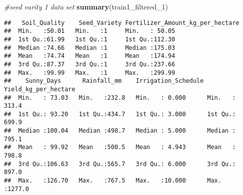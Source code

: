 \documentclass[
]{article}
\newenvironment{Shaded}{\begin{snugshade}}{\end{snugshade}}
\newcommand{\CommentTok}[1]{\textcolor[rgb]{0.56,0.35,0.01}{\textit{#1}}}
\newcommand{\FunctionTok}[1]{\textcolor[rgb]{0.13,0.29,0.53}{\textbf{#1}}}
\newcommand{\NormalTok}[1]{#1}
\begin{document}
\begin{Shaded}
\begin{Highlighting}[]
\CommentTok{\#seed varity 1 data set}
\FunctionTok{summary}\NormalTok{(train1\_filtered\_1)}
\end{Highlighting}
\end{Shaded}

\begin{verbatim}
##   Soil_Quality    Seed_Variety Fertilizer_Amount_kg_per_hectare
##  Min.   :50.01   Min.   :1     Min.   : 50.05                  
##  1st Qu.:61.99   1st Qu.:1     1st Qu.:112.30                  
##  Median :74.66   Median :1     Median :175.03                  
##  Mean   :74.74   Mean   :1     Mean   :174.94                  
##  3rd Qu.:87.37   3rd Qu.:1     3rd Qu.:237.66                  
##  Max.   :99.99   Max.   :1     Max.   :299.99                  
##    Sunny_Days      Rainfall_mm    Irrigation_Schedule Yield_kg_per_hectare
##  Min.   : 73.03   Min.   :232.8   Min.   : 0.000      Min.   : 313.4      
##  1st Qu.: 93.20   1st Qu.:434.7   1st Qu.: 3.000      1st Qu.: 699.9      
##  Median :100.04   Median :498.7   Median : 5.000      Median : 795.1      
##  Mean   : 99.92   Mean   :500.5   Mean   : 4.943      Mean   : 798.8      
##  3rd Qu.:106.63   3rd Qu.:565.7   3rd Qu.: 6.000      3rd Qu.: 897.0      
##  Max.   :126.70   Max.   :767.5   Max.   :10.000      Max.   :1277.0
\end{verbatim}
\end{document}
